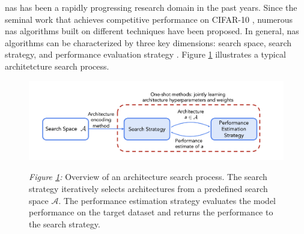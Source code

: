 \documentclass[a4paper,oneside,bibliography=totoc]{scrbook}
\begin{document}
\gls{nas} has been a rapidly progressing research domain in the past years. Since the seminal work that achieves competitive performance on CIFAR-10 \cite{zoph2017neural}, numerous \gls{nas} algorithms built on different techniques have been proposed. In general, \gls{nas} algorithms can be characterized by three key dimensions: search space, search strategy, and performance evaluation strategy \cite{elsken2019neural, white2023survey, wistuba2019survey}. Figure \ref{fig: nas_overview} illustrates a typical architetcture search process.


\begin{figure}[htbp]
	\centering
	\includegraphics[scale=0.5]{figs/overview_nas.png}
	\label{fig: nas_overview}
	\parbox{\linewidth}{
	 \vspace{0.5em}
 	 {\small \textit{Figure \ref{fig: nas_overview}:} Overview of an architecture search process. The search strategy iteratively selects architectures from a predefined search space $\mathcal{A}$. The performance estimation strategy evaluates the model performance on the target dataset and returns the performance to the search strategy.
	}
 	}
\end{figure}
\end{document}
